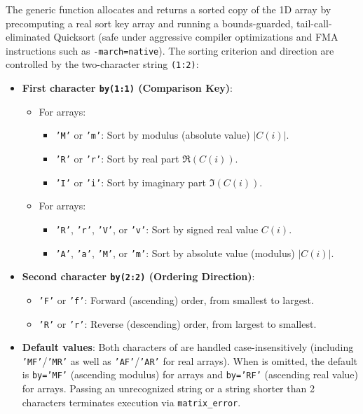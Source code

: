 The generic function  allocates and returns a sorted copy  of the 1D array  by precomputing a real sort key array and running a bounds-guarded, tail-call-eliminated Quicksort (safe under aggressive compiler optimizations and FMA instructions such as \texttt{-march=native}). The sorting criterion and direction are controlled by the two-character string \texttt{(1:2)}:
\begin{itemize}
  \item \textbf{First character \texttt{by(1:1)} (Comparison Key)}:
  \begin{itemize}
    \item For  arrays:
      \begin{itemize}
        \item \texttt{'M'} or \texttt{'m'}: Sort by modulus (absolute value) $|C(i)|$.
        \item \texttt{'R'} or \texttt{'r'}: Sort by real part $\Re(C(i))$.
        \item \texttt{'I'} or \texttt{'i'}: Sort by imaginary part $\Im(C(i))$.
      \end{itemize}
    \item For  arrays:
      \begin{itemize}
        \item \texttt{'R'}, \texttt{'r'}, \texttt{'V'}, or \texttt{'v'}: Sort by signed real value $C(i)$.
        \item \texttt{'A'}, \texttt{'a'}, \texttt{'M'}, or \texttt{'m'}: Sort by absolute value (modulus) $|C(i)|$.
      \end{itemize}
  \end{itemize}
  \item \textbf{Second character \texttt{by(2:2)} (Ordering Direction)}:
  \begin{itemize}
    \item \texttt{'F'} or \texttt{'f'}: Forward (ascending) order, from smallest to largest.
    \item \texttt{'R'} or \texttt{'r'}: Reverse (descending) order, from largest to smallest.
  \end{itemize}
  \item \textbf{Default values}: Both characters of  are handled case-insensitively (including \texttt{'MF'}/\texttt{'MR'} as well as \texttt{'AF'}/\texttt{'AR'} for real arrays). When  is omitted, the default is \texttt{by='MF'} (ascending modulus) for  arrays and \texttt{by='RF'} (ascending real value) for  arrays. Passing an unrecognized  string or a string shorter than 2 characters terminates execution via \texttt{matrix\_error}.
\end{itemize}

